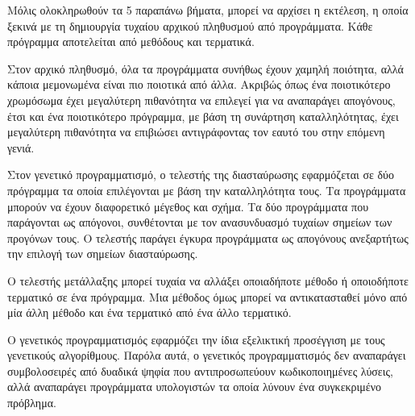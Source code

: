 Μόλις ολοκληρωθούν τα 5 παραπάνω βήματα, μπορεί να αρχίσει η εκτέλεση, η οποία ξεκινά με τη δημιουργία τυχαίου αρχικού πληθυσμού από προγράμματα. Κάθε πρόγραμμα αποτελείται από μεθόδους και τερματικά.

Στον αρχικό πληθυσμό, όλα τα προγράμματα συνήθως έχουν χαμηλή ποιότητα, αλλά κάποια μεμονωμένα είναι πιο ποιοτικά από άλλα. Ακριβώς όπως ένα ποιοτικότερο χρωμόσωμα έχει μεγαλύτερη πιθανότητα να επιλεγεί για να αναπαράγει απογόνους, έτσι και ένα ποιοτικότερο πρόγραμμα, με βάση τη συνάρτηση καταλληλότητας, έχει μεγαλύτερη πιθανότητα να επιβιώσει αντιγράφοντας τον εαυτό του στην επόμενη γενιά.

Στον γενετικό προγραμματισμό, ο τελεστής της διασταύρωσης εφαρμόζεται σε δύο πρόγραμμα τα οποία επιλέγονται με βάση την καταλληλότητα τους. Τα προγράμματα μπορούν να έχουν διαφορετικό μέγεθος και σχήμα. Τα δύο προγράμματα που παράγονται ως απόγονοι, συνθέτονται με τον ανασυνδυασμό τυχαίων σημείων των προγόνων τους. Ο τελεστής παράγει έγκυρα προγράμματα ως απογόνους ανεξαρτήτως την επιλογή των σημείων διασταύρωσης.

Ο τελεστής μετάλλαξης μπορεί τυχαία να αλλάξει οποιαδήποτε μέθοδο ή οποιοδήποτε τερματικό σε ένα πρόγραμμα. Μια μέθοδος όμως μπορεί να αντικατασταθεί μόνο από μία άλλη μέθοδο και ένα τερματικό από ένα άλλο τερματικό.

Ο γενετικός προγραμματισμός εφαρμόζει την ίδια εξελικτική προσέγγιση με τους γενετικούς αλγορίθμους. Παρόλα αυτά, ο γενετικός προγραμματισμός δεν αναπαράγει συμβολοσειρές από δυαδικά ψηφία που αντιπροσωπεύουν κωδικοποιημένες λύσεις, αλλά αναπαράγει προγράμματα υπολογιστών τα οποία λύνουν ένα συγκεκριμένο πρόβλημα.
